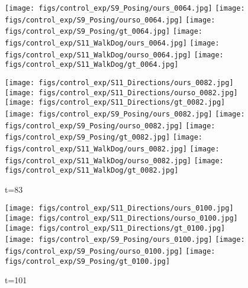 \documentclass{article}
\begin{document}
\begin{appendix}
\begin{figure*}[!thbp]
\begin{subfigure}{0.12\linewidth}
  		\texttt{[image: figs/control\_exp/S9\_Posing/ours\_0064.jpg]}
  		\texttt{[image: figs/control\_exp/S9\_Posing/ourso\_0064.jpg]}
  		\vspace{.2cm}
  		\texttt{[image: figs/control\_exp/S9\_Posing/gt\_0064.jpg]}
  		\texttt{[image: figs/control\_exp/S11\_WalkDog/ours\_0064.jpg]}
  		\texttt{[image: figs/control\_exp/S11\_WalkDog/ourso\_0064.jpg]}
  		\vspace{.2cm}
  		\texttt{[image: figs/control\_exp/S11\_WalkDog/gt\_0064.jpg]}
	\end{subfigure}
	\begin{subfigure}{0.12\linewidth}
        \caption*{t=83}
        \vspace{-7pt}
	    \texttt{[image: figs/control\_exp/S11\_Directions/ours\_0082.jpg]}
	    \texttt{[image: figs/control\_exp/S11\_Directions/ourso\_0082.jpg]}
	    \vspace{.2cm}
  		\texttt{[image: figs/control\_exp/S11\_Directions/gt\_0082.jpg]}
  		\texttt{[image: figs/control\_exp/S9\_Posing/ours\_0082.jpg]}
  		\texttt{[image: figs/control\_exp/S9\_Posing/ourso\_0082.jpg]}
  		\vspace{.2cm}
  		\texttt{[image: figs/control\_exp/S9\_Posing/gt\_0082.jpg]}
  		\texttt{[image: figs/control\_exp/S11\_WalkDog/ours\_0082.jpg]}
  		\texttt{[image: figs/control\_exp/S11\_WalkDog/ourso\_0082.jpg]}
  		\vspace{.2cm}
  		\texttt{[image: figs/control\_exp/S11\_WalkDog/gt\_0082.jpg]}
	\end{subfigure}
	\begin{subfigure}{0.12\linewidth}
        \caption*{t=101}
        \vspace{-7pt}
	    \texttt{[image: figs/control\_exp/S11\_Directions/ours\_0100.jpg]}
	    \texttt{[image: figs/control\_exp/S11\_Directions/ourso\_0100.jpg]}
	    \vspace{.2cm}
  		\texttt{[image: figs/control\_exp/S11\_Directions/gt\_0100.jpg]}
  		\texttt{[image: figs/control\_exp/S9\_Posing/ours\_0100.jpg]}
  		\texttt{[image: figs/control\_exp/S9\_Posing/ourso\_0100.jpg]}
  		\vspace{.2cm}
  		\texttt{[image: figs/control\_exp/S9\_Posing/gt\_0100.jpg]}

\end{subfigure}
\end{figure*}
\end{appendix}
\end{document}
